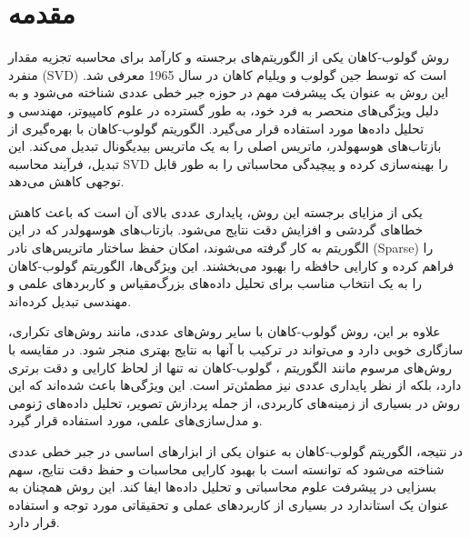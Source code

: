 \section{مقدمه}


روش گولوب-کاهان یکی از الگوریتم‌های برجسته و کارآمد برای محاسبه تجزیه مقدار منفرد (SVD) است که توسط جین گولوب و ویلیام کاهان در سال 1965 معرفی شد. این روش به عنوان یک پیشرفت مهم در حوزه جبر خطی عددی شناخته می‌شود و به دلیل ویژگی‌های منحصر به فرد خود، به طور گسترده در علوم کامپیوتر، مهندسی و تحلیل داده‌ها مورد استفاده قرار می‌گیرد. الگوریتم گولوب-کاهان با بهره‌گیری از بازتاب‌های هوسهولدر، ماتریس اصلی را به یک ماتریس بیدیگونال تبدیل می‌کند. این تبدیل، فرآیند محاسبه SVD را بهینه‌سازی کرده و پیچیدگی محاسباتی را به طور قابل توجهی کاهش می‌دهد. 

یکی از مزایای برجسته این روش، پایداری عددی بالای آن است که باعث کاهش خطاهای گردشی و افزایش دقت نتایج می‌شود. بازتاب‌های هوسهولدر که در این الگوریتم به کار گرفته می‌شوند، امکان حفظ ساختار ماتریس‌های نادر (Sparse) را فراهم کرده و کارایی حافظه را بهبود می‌بخشند. این ویژگی‌ها، الگوریتم گولوب-کاهان را به یک انتخاب مناسب برای تحلیل داده‌های بزرگ‌مقیاس و کاربردهای علمی و مهندسی تبدیل کرده‌اند.

علاوه بر این، روش گولوب-کاهان با سایر روش‌های عددی، مانند روش‌های تکراری، سازگاری خوبی دارد و می‌تواند در ترکیب با آنها به نتایج بهتری منجر شود. در مقایسه با روش‌های مرسوم مانند الگوریتم ، گولوب-کاهان نه تنها از لحاظ کارایی و دقت برتری دارد، بلکه از نظر پایداری عددی نیز مطمئن‌تر است. این ویژگی‌ها باعث شده‌اند که این روش در بسیاری از زمینه‌های کاربردی، از جمله پردازش تصویر، تحلیل داده‌های ژنومی و مدل‌سازی‌های علمی، مورد استفاده قرار گیرد.

در نتیجه، الگوریتم گولوب-کاهان به عنوان یکی از ابزارهای اساسی در جبر خطی عددی شناخته می‌شود که توانسته است با بهبود کارایی محاسبات و حفظ دقت نتایج، سهم بسزایی در پیشرفت علوم محاسباتی و تحلیل داده‌ها ایفا کند. این روش همچنان به عنوان یک استاندارد در بسیاری از کاربردهای عملی و تحقیقاتی مورد توجه و استفاده قرار دارد.
